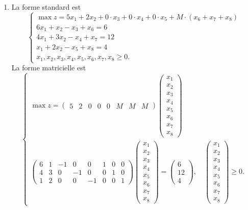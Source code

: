 {\begin{td-sol}[]
\begin{enumerate}
			\item La forme standard est
			\begin{equation*}
				\begin{cases}
					\max z = 5x_1 + 2x_2 + 0\cdot x_3 + 0\cdot x_4 + 0\cdot x_5 + M\cdot (x_6 + x_7 + x_8)\\
					6x_1 + x_2 - x_3 + x_6= 6 \\
					4x_1 + 3x_2 - x_4 + x_7 = 12 \\
					x_1 + 2x_2 - x_5 + x_8 = 4 \\
					x_1, x_2, x_3, x_4, x_5, x_6, x_7, x_8 \geq 0.
				\end{cases}
			\end{equation*}
			La forme matricielle est
			\begin{equation*}
				\begin{cases}
					\max z = \begin{pmatrix} 5 & 2 & 0 & 0 & 0 & M & M & M \end{pmatrix} \begin{pmatrix} x_1 \\ x_2 \\ x_3 \\ x_4 \\ x_5 \\ x_6 \\ x_7 \\ x_8 \end{pmatrix} \\
					\begin{pmatrix}
						6 & 1 & -1 & 0 & 0 & 1 & 0 & 0 \\
						4 & 3 & 0 & -1 & 0 & 0 & 1 & 0 \\
						1 & 2 & 0 & 0 & -1 & 0 & 0 & 1
					\end{pmatrix}
					\begin{pmatrix} x_1 \\ x_2 \\ x_3 \\ x_4 \\ x_5 \\ x_6 \\ x_7 \\ x_8 \end{pmatrix}
					=
					\begin{pmatrix} 6 \\ 12 \\ 4 \end{pmatrix}, \quad
					\begin{pmatrix} x_1 \\ x_2 \\ x_3 \\ x_4 \\ x_5 \\ x_6 \\ x_7 \\ x_8 \end{pmatrix} \geq 0.
				\end{cases}
			\end{equation*}
		\end{enumerate}
	\end{td-sol}
}{}


